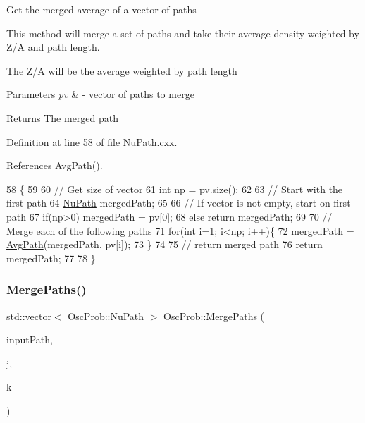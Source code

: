 Get the merged average of a vector of paths

This method will merge a set of paths and take their average density weighted by Z/A and path length.

The Z/A will be the average weighted by path length


\begin{DoxyParams}{Parameters}
{\em pv} & -\/ vector of paths to merge \\
\hline
\end{DoxyParams}
\begin{DoxyReturn}{Returns}
The merged path 
\end{DoxyReturn}


Definition at line 58 of file Nu\+Path.\+cxx.



References Avg\+Path().


\begin{DoxyCode}
58                                                           \{
59 
60   \textcolor{comment}{// Get size of vector}
61   \textcolor{keywordtype}{int} np = pv.size();
62   
63   \textcolor{comment}{// Start with the first path}
64   \hyperlink{structOscProb_1_1NuPath}{NuPath} mergedPath;
65   
66   \textcolor{comment}{// If vector is not empty, start on first path}
67   \textcolor{keywordflow}{if}(np>0) mergedPath = pv[0];
68   \textcolor{keywordflow}{else} \textcolor{keywordflow}{return} mergedPath;
69 
70   \textcolor{comment}{// Merge each of the following paths}
71   \textcolor{keywordflow}{for}(\textcolor{keywordtype}{int} i=1; i<np; i++)\{
72     mergedPath = \hyperlink{namespaceOscProb_a999a7944bad8bc72d7ee9f56f81a210e}{AvgPath}(mergedPath, pv[i]);
73   \}
74 
75   \textcolor{comment}{// return merged path}
76   \textcolor{keywordflow}{return} mergedPath;
77 
78 \}
\end{DoxyCode}
\mbox{\label{namespaceOscProb_a7c203d8583a34acf2ae90185ba45f866}} 
\subsubsection{\texorpdfstring{Merge\+Paths()}{MergePaths()}}
{\footnotesize\ttfamily std\+::vector$<$ \hyperlink{structOscProb_1_1NuPath}{Osc\+Prob\+::\+Nu\+Path} $>$ Osc\+Prob\+::\+Merge\+Paths (\begin{DoxyParamCaption}\item[{std\+::vector$<$ \hyperlink{structOscProb_1_1NuPath}{Osc\+Prob\+::\+Nu\+Path} $>$ \&}]{input\+Path,  }\item[{int}]{j,  }\item[{int}]{k }\end{DoxyParamCaption})}

